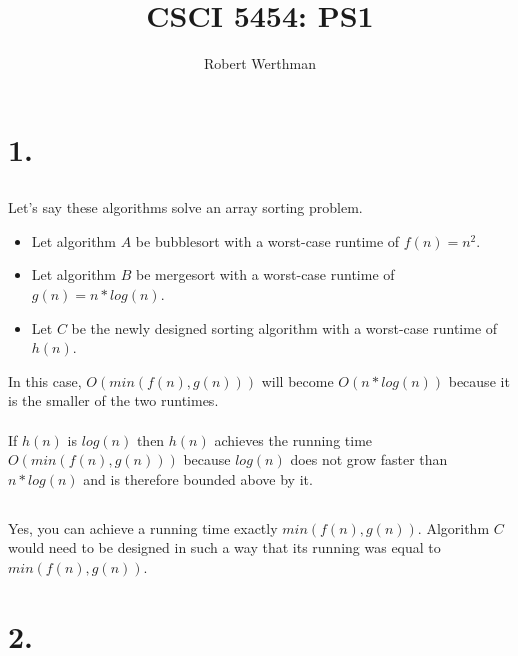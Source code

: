 \documentclass[12pt]{article}
\begin{document}
\title{CSCI 5454: PS1}
\author{Robert Werthman}
\date{}
\maketitle

\section*{1.}

\subsection*{}
Let's say these algorithms solve an array sorting problem.\\
\begin{itemize}
\item Let algorithm $A$ be bubblesort with a worst-case runtime of $f(n) = n^2$.\\
\item Let algorithm $B$ be mergesort with a worst-case runtime of $g(n) = n*log(n)$.\\
\item Let $C$ be the newly designed sorting algorithm with a worst-case runtime of $h(n)$.\\
\end{itemize}
In this case, $O(min(f(n),g(n)))$ will become $O(n*log(n))$ because it is the smaller of the two runtimes.\\
\\
If $h(n)$ is $log(n)$ then $h(n)$ achieves the running time $O(min(f(n),g(n)))$ because $log(n)$ does not grow faster than $n*log(n)$ and is therefore bounded above by it.\\

\subsection*{}
Yes, you can achieve a running time exactly $min(f(n),g(n))$. Algorithm $C$ would need to be designed in such a way that its running was equal to $min(f(n),g(n))$.\\

\section*{2.}
\end{document}
